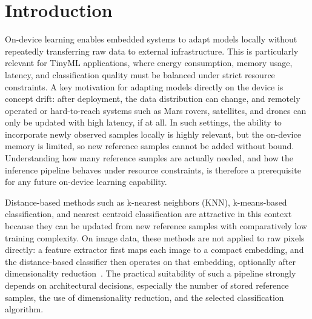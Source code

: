 \documentclass[sigconf,review]{acmart}
\begin{document}


\maketitle

\section{Introduction}
On-device learning enables embedded systems to adapt models locally without repeatedly transferring raw data to external infrastructure.
This is particularly relevant for TinyML applications, where energy consumption, memory usage, latency, and classification quality must be balanced under strict resource constraints.
A key motivation for adapting models directly on the device is concept drift: after deployment, the data distribution can change, and remotely operated or hard-to-reach systems such as Mars rovers, satellites, and drones can only be updated with high latency, if at all.
In such settings, the ability to incorporate newly observed samples locally is highly relevant, but the on-device memory is limited, so new reference samples cannot be added without bound.
Understanding how many reference samples are actually needed, and how the inference pipeline behaves under resource constraints, is therefore a prerequisite for any future on-device learning capability.

Distance-based methods such as k-nearest neighbors (KNN), k-means-based classification, and nearest centroid classification are attractive in this context because they can be updated from new reference samples with comparatively low training complexity.
On image data, these methods are not applied to raw pixels directly: a feature extractor first maps each image to a compact embedding, and the distance-based classifier then operates on that embedding, optionally after dimensionality reduction~\cite{disabato2020incremental}.
The practical suitability of such a pipeline strongly depends on architectural decisions, especially the number of stored reference samples, the use of dimensionality reduction, and the selected classification algorithm.
\end{document}
